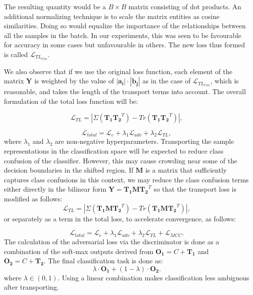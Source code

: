\documentclass[10pt,twocolumn,letterpaper]{article}
\begin{document}
The resulting quantity would be a $B \times B$ matrix consisting of dot products. An additional normalizing technique is to scale the matrix entities as cosine similarities. Doing so would equalize the importance of the relationships between all the samples in the batch. In our experiments, this was seen to be favourable for accuracy in some cases but unfavourable in others.  The new loss thus formed is called $\mathcal{L}_{TL_{Cos}}$. 

We also observe that if we use the original loss function, each element of the matrix $\mathbf{Y}$ is weighted by the value of $\mathbf{| a_i | \cdot | b_j |}$ as in the case of $\mathcal{L}_{TL_{Cos}}$, which is reasonable, and takes the length of the transport terms into account. The overall formulation of the total loss function will be: 

\begin{equation}
\label{eq:L_TL}
    \mathcal{L}_{TL} = |\Sigma (\mathbf{T_1} \mathbf{T_2}^T) - Tr(\mathbf{T_1} \mathbf{T_2}^T)| ,
\end{equation}

\begin{equation}
\label{eq:total_loss}
    \mathcal{L}_{total} = \mathcal{L}_{c} + \lambda_{1} \mathcal{L}_{adv} + \lambda_{2} \mathcal{L}_{TL},
\end{equation}
where $\lambda_1$ and $\lambda_2$ are non-negative hyperparameters. Transporting the sample representations in the classification space will be expected to reduce class confusion of the classifier. However, this may cause crowding near some of the decision boundaries in the shifted region. If $\mathbf{M}$ is a matrix that sufficiently captures class confusions in this context, we may reduce the class confusion terms either directly in the bilinear form $\mathbf{Y} = \mathbf{T_1} \mathbf{M} \mathbf{T_2}^T$ so that the transport loss is modified as follows:
\begin{equation}
\label{eq:L_TL_modified}
    \mathcal{L}_{TL} = | \Sigma (\mathbf{T_1} \mathbf{M} \mathbf{T_2}^T) - Tr(\mathbf{T_1} \mathbf{M} \mathbf{T_2}^T) |,
\end{equation}
or separately as a term in the total loss, to accelerate convergence, as follows:

\begin{equation}
    \mathcal{L}_{total} = \mathcal{L}_{c} + \lambda_1 \mathcal{L}_{adv} + \lambda_2\mathcal{L}_{TL} + \mathcal{L}_{MCC}.
\end{equation}
The calculation of the adversarial loss via the discriminator is done as a combination of the soft-max outputs derived from $\mathbf{O_1} = C + \mathbf{T_1}$ and $\mathbf{O_2} = C + \mathbf{T_2}$. The final classification task is done as:
\begin{equation}
    \lambda \cdot \mathbf{O_1} + (1-\lambda)  \cdot \mathbf{O_2}.
\end{equation}
where $\lambda \in (0,1)$. Using a linear combination makes classification less ambiguous after transporting. 
\end{document}
